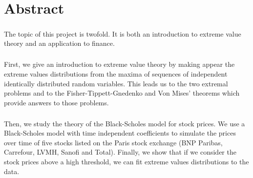 

\cleardoublepage
\chapter*{Abstract}
\bigskip
\paragraph{}
The topic of this project is twofold. It is both an introduction to extreme value theory and an application to finance.
\paragraph{}
First, we give an introduction to extreme value theory by making appear the extreme values distributions from the maxima of sequences of independent identically distributed random variables. This leads us to the two extremal problems and to the Fisher-Tippett-Gnedenko and Von Mises' theorems which provide answers to those problems.
\paragraph{}
Then, we study the theory of the Black-Scholes model for stock prices. We use a Black-Scholes model with time independent coefficients to simulate the prices over time of five stocks listed on the Paris stock exchange (BNP Paribas, Carrefour, LVMH, Sanofi and Total). Finally, we show that if we consider the stock prices above a high threshold, we can fit extreme values distributions to the data.
\vskip0.5cm


